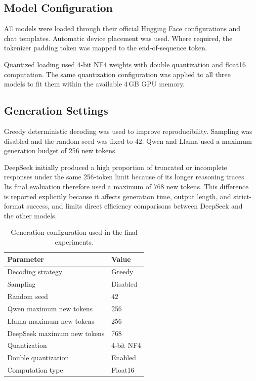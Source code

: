 \documentclass{article}
\begin{document}
\subsection{Model Configuration}

All models were loaded through their official Hugging Face
configurations and chat templates. Automatic device placement was used.
Where required, the tokenizer padding token was mapped to the
end-of-sequence token.

Quantized loading used 4-bit NF4 weights with double quantization and
float16 computation. The same quantization configuration was applied
to all three models to fit them within the available 4\,GB GPU memory.

\subsection{Generation Settings}

Greedy deterministic decoding was used to improve reproducibility.
Sampling was disabled and the random seed was fixed to 42. Qwen and
Llama used a maximum generation budget of 256 new tokens.

DeepSeek initially produced a high proportion of truncated or
incomplete responses under the same 256-token limit because of its
longer reasoning traces. Its final evaluation therefore used a maximum
of 768 new tokens. This difference is reported explicitly because it
affects generation time, output length, and strict-format success, and
limits direct efficiency comparisons between DeepSeek and the other
models.

\begin{table}[t]
\centering
\caption{Generation configuration used in the final experiments.}
\label{tab:generation}
\begin{tabular}{ll}
\toprule
\textbf{Parameter} & \textbf{Value} \\
\midrule
Decoding strategy & Greedy \\
Sampling & Disabled \\
Random seed & 42 \\
Qwen maximum new tokens & 256 \\
Llama maximum new tokens & 256 \\
DeepSeek maximum new tokens & 768 \\
Quantization & 4-bit NF4 \\
Double quantization & Enabled \\
Computation type & Float16 \\
\bottomrule
\end{tabular}
\end{table}
\end{document}
